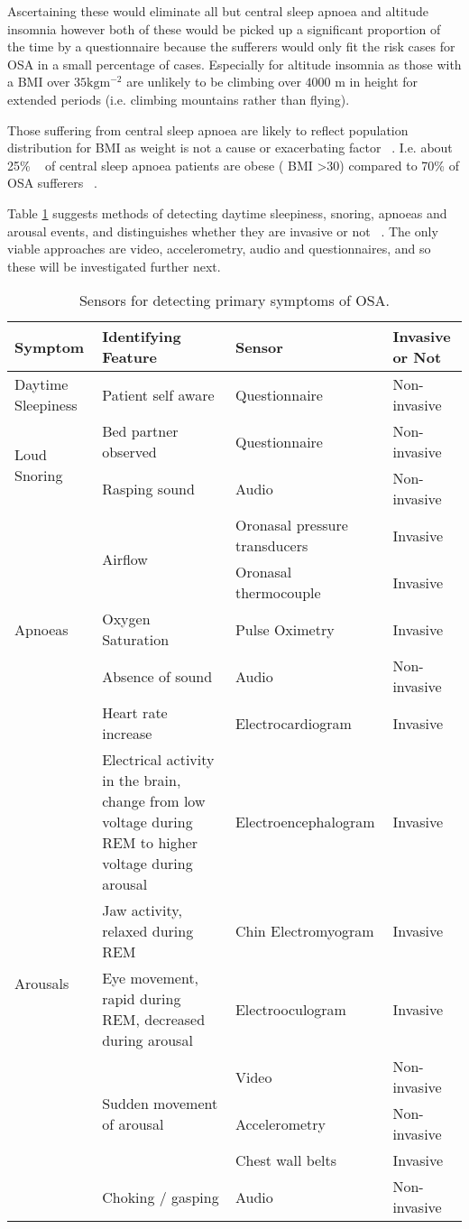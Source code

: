 Ascertaining these would eliminate all but central sleep apnoea and altitude insomnia however both of these would be picked up a significant proportion of the time by a questionnaire because the sufferers would only fit the risk cases for OSA in a small percentage of cases. Especially for altitude insomnia as those with a BMI over $35 \text{kg} \text{m}^{-2}$ are unlikely to be climbing over $4000$ m in height for extended periods (i.e. climbing mountains rather than flying).

Those suffering from central sleep apnoea are likely to reflect population distribution for BMI as weight is not a cause or exacerbating factor ~\cite{american2001international}. I.e. about 25\% ~\cite{adultobesity} of central sleep apnoea patients are obese ( BMI >30) compared to 70\% of OSA sufferers ~\cite{malhotra2002obstructive}.

Table \ref{table:X3} suggests methods of detecting daytime sleepiness, snoring, apnoeas and arousal events, and distinguishes whether they are invasive or not ~\cite{ iber2007aasm}. The only viable approaches are video, accelerometry, audio and questionnaires, and so these will be investigated further next.

\begin{table}[h]
\centering
\begin{tabular}{l l l l}
\toprule
Symptom&Identifying Feature&Sensor&Invasive or Not\\ \midrule
Daytime Sleepiness&Patient self aware&Questionnaire&Non-invasive\\ 
\multirow{2}{*}{Loud Snoring}&Bed partner observed&Questionnaire&Non-invasive\\ 
&Rasping sound&Audio&Non-invasive\\ 
\multirow{5}{*}{Apnoeas}&\multirow{2}{*}{Airflow}&Oronasal pressure transducers&Invasive\\ 
&&Oronasal thermocouple&Invasive\\ 
&Oxygen Saturation&Pulse Oximetry&Invasive\\ 
&Absence of sound&Audio&Non-invasive\\ 
&Heart rate increase&Electrocardiogram&Invasive\\ 
\multirow{7}{*}{Arousals}&Electrical activity in the brain, change from low voltage \newline during REM to higher voltage during arousal&Electroencephalogram&Invasive\\ 
&Jaw activity, relaxed during REM&Chin Electromyogram&Invasive\\ 
&Eye movement, rapid during REM, decreased during arousal&Electrooculogram&Invasive\\ 
&\multirow{3}{*}{Sudden movement of arousal}&Video&Non-invasive\\ 
&&Accelerometry&Non-invasive\\ 
&&Chest wall belts&Invasive\\ 
&Choking / gasping&Audio&Non-invasive\\ \bottomrule
\end{tabular}
\caption{Sensors for detecting primary symptoms of OSA.}
\label{table:X3}
\end{table}
